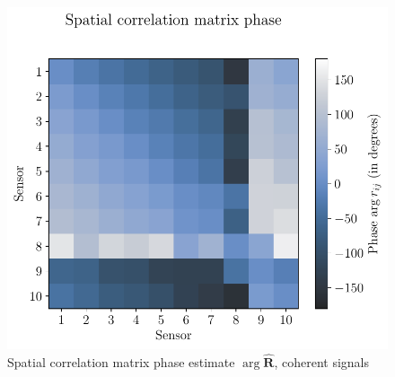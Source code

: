 \documentclass[UKenglish,8pt,aspectratio=1610]{beamer}
\begin{document}
\begin{frame}
\begin{columns}
\begin{column}{0.5\textwidth}
\begin{figure}[h!]
			\includegraphics[scale=0.45]{question8/matrices/spatial_correlation_matrix_phase.pdf}
			\caption{Spatial correlation matrix phase estimate $\arg \boldsymbol{\hat{\mathbf{R}}}$, coherent signals}
		\end{figure}
	\end{column}
\end{columns} 
\end{frame}
\end{document}
